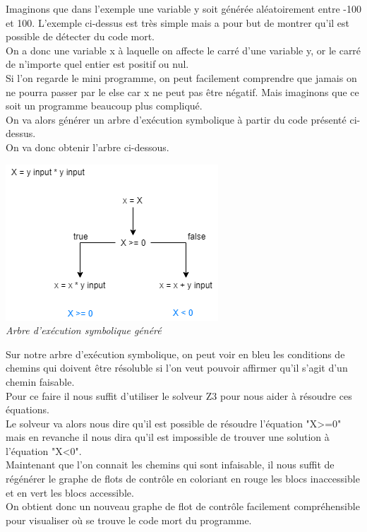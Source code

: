\documentclass[a4paper,twoside,12pt,openright]{report}
\begin{document}
Imaginons que dans l'exemple une variable y soit générée aléatoirement entre -100 et 100.
L'exemple ci-dessus est très simple mais a pour but de montrer qu'il est possible de détecter du code mort.\\
On a donc une variable x à laquelle on affecte le carré d'une variable y, or le carré de n'importe quel entier est positif ou nul.\\ Si l'on regarde le mini programme, on peut facilement comprendre que jamais on ne pourra passer par le else car x ne peut pas être négatif. Mais imaginons que ce soit un programme beaucoup plus compliqué.\\
On va alors générer un arbre d’exécution symbolique à partir du code présenté ci-dessus.\\
On va donc obtenir l’arbre ci-dessous.\\


\begin{center}
\includegraphics[scale=0.9]{Image/ExempleArbreExecutionSymbolique2.png}\\
\itshape{Arbre d'exécution symbolique généré}
\end{center}

Sur notre arbre d'exécution symbolique, on peut voir en bleu les conditions de chemins qui doivent être résoluble si l'on veut pouvoir affirmer qu'il s'agit d'un chemin faisable.\\
Pour ce faire il nous suffit d'utiliser le solveur Z3 pour nous aider à résoudre ces équations.\\
Le solveur va alors nous dire qu'il est possible de résoudre l'équation "X>=0" mais en revanche il nous dira qu'il est impossible de trouver une solution à l'équation "X<0".\\
Maintenant que l'on connait les chemins qui sont infaisable, il nous suffit de régénérer le graphe de flots de contrôle en coloriant en rouge les blocs inaccessible et en vert les blocs accessible.\\
On obtient donc un nouveau graphe de flot de contrôle facilement compréhensible pour visualiser où se trouve le code mort du programme.
\end{document}
